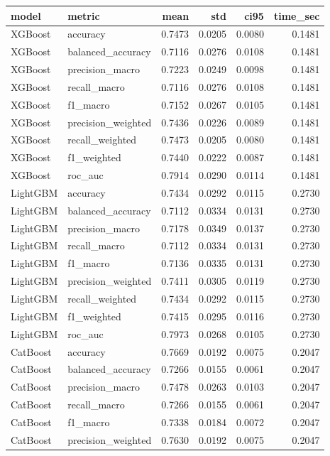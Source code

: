 \begin{tabular}{llrrrr}
\toprule
model & metric & mean & std & ci95 & time_sec \\
\midrule
XGBoost & accuracy & 0.7473 & 0.0205 & 0.0080 & 0.1481 \\
XGBoost & balanced_accuracy & 0.7116 & 0.0276 & 0.0108 & 0.1481 \\
XGBoost & precision_macro & 0.7223 & 0.0249 & 0.0098 & 0.1481 \\
XGBoost & recall_macro & 0.7116 & 0.0276 & 0.0108 & 0.1481 \\
XGBoost & f1_macro & 0.7152 & 0.0267 & 0.0105 & 0.1481 \\
XGBoost & precision_weighted & 0.7436 & 0.0226 & 0.0089 & 0.1481 \\
XGBoost & recall_weighted & 0.7473 & 0.0205 & 0.0080 & 0.1481 \\
XGBoost & f1_weighted & 0.7440 & 0.0222 & 0.0087 & 0.1481 \\
XGBoost & roc_auc & 0.7914 & 0.0290 & 0.0114 & 0.1481 \\
LightGBM & accuracy & 0.7434 & 0.0292 & 0.0115 & 0.2730 \\
LightGBM & balanced_accuracy & 0.7112 & 0.0334 & 0.0131 & 0.2730 \\
LightGBM & precision_macro & 0.7178 & 0.0349 & 0.0137 & 0.2730 \\
LightGBM & recall_macro & 0.7112 & 0.0334 & 0.0131 & 0.2730 \\
LightGBM & f1_macro & 0.7136 & 0.0335 & 0.0131 & 0.2730 \\
LightGBM & precision_weighted & 0.7411 & 0.0305 & 0.0119 & 0.2730 \\
LightGBM & recall_weighted & 0.7434 & 0.0292 & 0.0115 & 0.2730 \\
LightGBM & f1_weighted & 0.7415 & 0.0295 & 0.0116 & 0.2730 \\
LightGBM & roc_auc & 0.7973 & 0.0268 & 0.0105 & 0.2730 \\
CatBoost & accuracy & 0.7669 & 0.0192 & 0.0075 & 0.2047 \\
CatBoost & balanced_accuracy & 0.7266 & 0.0155 & 0.0061 & 0.2047 \\
CatBoost & precision_macro & 0.7478 & 0.0263 & 0.0103 & 0.2047 \\
CatBoost & recall_macro & 0.7266 & 0.0155 & 0.0061 & 0.2047 \\
CatBoost & f1_macro & 0.7338 & 0.0184 & 0.0072 & 0.2047 \\
CatBoost & precision_weighted & 0.7630 & 0.0192 & 0.0075 & 0.2047 \\

\end{tabular}
